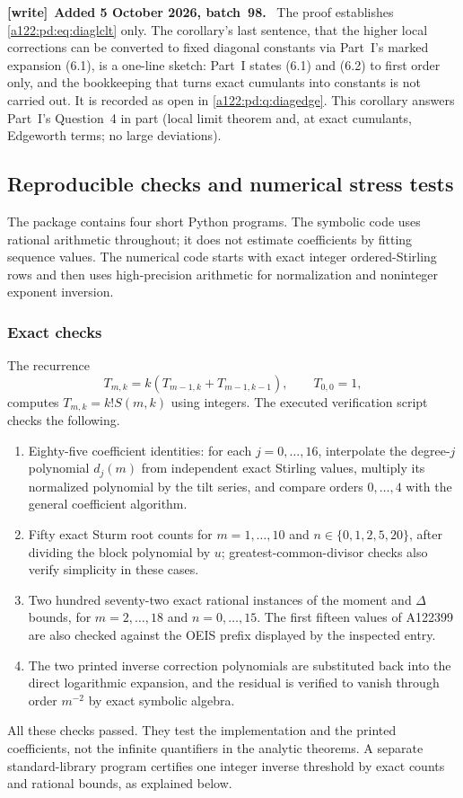\documentclass[11pt,letterpaper]{article}
\newenvironment{writenote}[1][]{\par\smallskip\begingroup\small
 \noindent\textbf{[write]}\if\relax\detokenize{#1}\relax\else~\textbf{#1.}\fi\ }%
 {\par\endgroup\smallskip}
\numberwithin{equation}{subsection}
\theoremstyle{definition}
\theoremstyle{remark}
\theoremstyle{plain}
\begin{document}
\begin{writenote}[Added 5 October 2026, batch~98]
The proof establishes \eqref{a122:pd:eq:diaglclt} only. The corollary's
last sentence, that the higher local corrections can be converted to
fixed diagonal constants via Part~I's marked expansion (6.1), is a
one-line sketch: Part~I states (6.1) and (6.2) to first order only, and
the bookkeeping that turns exact cumulants into constants is not carried
out. It is recorded as open in \cref{a122:pd:q:diagedge}. This
corollary answers Part~I's Question~4 in part (local limit theorem and,
at exact cumulants, Edgeworth terms; no large deviations).
\end{writenote}

\subsection{Reproducible checks and numerical stress tests}
\label{a122:pd:sec:checks}
The package contains four short Python programs. The symbolic code uses
rational arithmetic throughout; it does not estimate coefficients by
fitting sequence values. The numerical code starts with exact integer
ordered-Stirling rows and then uses high-precision arithmetic for
normalization and noninteger exponent inversion.

\subsubsection{Exact checks}
The recurrence
\begin{equation}\label{a122:pd:eq:Texact}
 T_{m,k}=k(T_{m-1,k}+T_{m-1,k-1}),\qquad T_{0,0}=1,
\end{equation}
computes $T_{m,k}=k!S(m,k)$ using integers.
The executed verification script checks the following.
\begin{enumerate}[itemsep=2pt]
\item Eighty-five coefficient identities: for each $j=0,\ldots,16$,
interpolate the degree-$j$ polynomial $d_j(m)$ from independent exact
Stirling values, multiply its normalized polynomial by the tilt series,
and compare orders $0,\ldots,4$ with the general coefficient algorithm.
\item Fifty exact Sturm root counts for $m=1,\ldots,10$ and
$n\in\{0,1,2,5,20\}$, after dividing the block polynomial by $u$;
greatest-common-divisor checks also verify simplicity in these cases.
\item Two hundred seventy-two exact rational instances of the moment
and $\Delta$ bounds, for $m=2,\ldots,18$ and $n=0,\ldots,15$.
The first fifteen values of A122399 are also checked against the OEIS
prefix displayed by the inspected entry.
\item The two printed inverse correction polynomials are substituted
back into the direct logarithmic expansion, and the residual is verified
to vanish through order $m^{-2}$ by exact symbolic algebra.
\end{enumerate}
All these checks passed. They test the implementation and the printed
coefficients, not the infinite quantifiers in the analytic theorems.
A separate standard-library program certifies one integer inverse
threshold by exact counts and rational bounds, as explained below.
\end{document}
